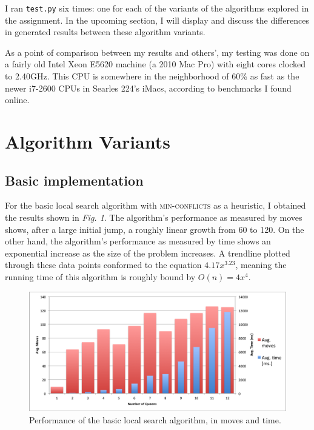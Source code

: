 \documentclass{article}
\begin{document}
\begin{doublespace}
I ran \texttt{test.py} six times: one for each of the variants of the algorithms explored in the assignment. In the upcoming section, I will display and discuss the differences in generated results between these algorithm variants.

As a point of comparison between my results and others', my testing was done on a fairly old Intel Xeon E5620 machine (a 2010 Mac Pro) with eight cores clocked to 2.40GHz. This CPU is somewhere in the neighborhood of 60\% as fast as the newer i7-2600 CPUs in Searles 224's iMacs, according to benchmarks I found online. 

\section{Algorithm Variants}
\subsection{Basic implementation}
For the basic local search algorithm with \textsc{min-conflicts} as a heuristic, I obtained the results shown in \textit{Fig. 1}. The algorithm's performance as measured by moves shows, after a large initial jump, a roughly linear growth from 60 to 120. On the other hand, the algorithm's performance as measured by time shows an exponential increase as the size of the problem increases. A trendline plotted through these data points conformed to the equation $4.17x^{3.23}$, meaning the running time of this algorithm is roughly bound by $O(n) = 4x^4$. \\

\begin{figure}[ht!]
\centering
\includegraphics[width=6.5in]{./base.png}
\caption{Performance of the basic local search algorithm, in moves and time.}
\end{figure}

\newpage


\end{doublespace}
\end{document}
